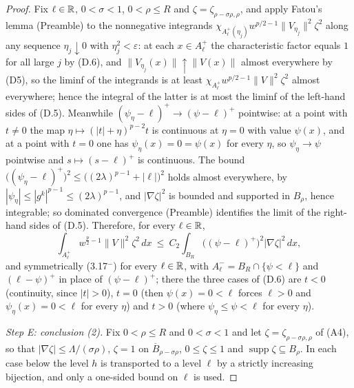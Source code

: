 \begin{proof}
Fix $\ell\in\mathbb{R}$, $0<\sigma<1$, $0<\rho\le R$ and $\zeta=\zeta_{\rho-\sigma\rho,\rho}$,
and apply Fatou's lemma (Preamble) to the nonnegative integrands
$\chi_{A^+_\ell(\eta_j)}w^{p/2-1}\|V_{\eta_j}\|^2\zeta^2$ along any sequence
$\eta_j\downarrow0$ with $\eta_j^2<\varepsilon$: at each $x\in A^+_\ell$ the
characteristic factor equals $1$ for all large $j$ by (D.6), and
$\|V_{\eta_j}(x)\|\uparrow\|V(x)\|$ almost everywhere by (D5), so the liminf of
the integrands is at least $\chi_{A^+_\ell}w^{p/2-1}\|V\|^2\zeta^2$ almost
everywhere; hence the integral of the latter is at most the liminf of the
left-hand sides of (D.5).  Meanwhile $(\psi_{\eta}-\ell)^+\to(\psi-\ell)^+$
pointwise: at a point with $t\ne0$ the map $\eta\mapsto(|t|+\eta)^{p-2}t$ is
continuous at $\eta=0$ with value $\psi(x)$, and at a point with $t=0$ one has
$\psi_\eta(x)=0=\psi(x)$ for every $\eta$, so $\psi_\eta\to\psi$ pointwise and
$s\mapsto(s-\ell)^+$ is continuous.  The bound
$\bigl((\psi_\eta-\ell)^+\bigr)^2\le\bigl((2\lambda)^{p-1}+|\ell|\bigr)^2$ holds
almost everywhere, by $|\psi_\eta|\le|g^k|^{p-1}\le(2\lambda)^{p-1}$, and
$|\nabla\zeta|^2$ is bounded and supported in $B_\rho$, hence integrable; so
dominated convergence (Preamble) identifies the limit of the right-hand sides of
(D.5).  Therefore, for every $\ell\in\mathbb{R}$,
\[
\int_{A^+_\ell}w^{\frac p2-1}\|V\|^2\zeta^2\,dx
\ \le\ C_2\int_{B_R}\bigl((\psi-\ell)^+\bigr)^2|\nabla\zeta|^2\,dx ,
\tag{3.17$^+$}
\]
and symmetrically (3.17$^-$) for every $\ell\in\mathbb{R}$, with
$A^-_\ell=B_R\cap\{\psi<\ell\}$ and $(\ell-\psi)^+$ in place of
$(\psi-\ell)^+$; there the three cases of (D.6) are $t<0$ (continuity, since
$|t|>0$), $t=0$ (then $\psi(x)=0<\ell$ forces $\ell>0$ and $\psi_\eta(x)=0<\ell$
for every $\eta$) and $t>0$ (where $\psi_\eta\le\psi<\ell$ for every $\eta$).

\emph{Step E: conclusion (2).}  Fix $0<\rho\le R$ and $0<\sigma<1$ and let
$\zeta=\zeta_{\rho-\sigma\rho,\rho}$ of (A4), so that
$|\nabla\zeta|\le\Lambda/(\sigma\rho)$, $\zeta=1$ on
$\overline B_{\rho-\sigma\rho}$, $0\le\zeta\le1$ and
$\operatorname{supp}\zeta\subseteq B_\rho$.  In each case below the level $h$ is
transported to a level $\ell$ by a strictly increasing bijection, and only a
one-sided bound on $\ell$ is used.


\end{proof}
